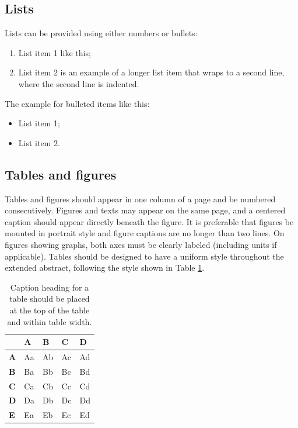 \documentclass[IAHRdraft]{IAHRYPN}
\begin{document}
\subsection{Lists}
Lists can be provided using either numbers or bullets:

\begin{enumerate}
    \item List item 1 like this;
    \item List item 2 is an example of a longer list item that wraps to a second line, where the second line is indented.
\end{enumerate}

The example for bulleted items like this:
\begin{itemize}
    \item List item 1;
    \item List item 2.
\end{itemize}



\subsection{Tables and figures}

Tables and figures should appear in one column of a page and be numbered consecutively.  Figures and texts may appear on the same page, and a centered caption should appear directly beneath the figure.  It is preferable that figures be mounted in portrait style and figure captions are no longer than two lines.  On figures showing graphs, both axes must be clearly labeled (including units if applicable). 
	Tables should be designed to have a uniform style throughout the extended abstract, following the style shown in Table \ref{Table1}. 
	
\begin{table}[H]\center
\caption{Caption heading for a table should be placed at the top of the table and within table width.}
\begin{tabular}{lllll}
\hline
           & \textbf{A} & \textbf{B} & \textbf{C} & \textbf{D} \\ \hline
\textbf{A} & Aa         & Ab         & Ac         & Ad         \\
\textbf{B} & Ba         & Bb         & Bc         & Bd         \\
\textbf{C} & Ca         & Cb         & Cc         & Cd         \\
\textbf{D} & Da         & Db         & Dc         & Dd         \\
\textbf{E} & Ea         & Eb         & Ec         & Ed         \\ \hline
\end{tabular}
\label{Table1}
\end{table}
\end{document}

